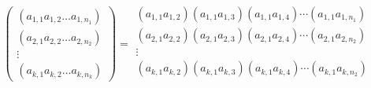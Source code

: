 $$ 
\left( 
	\begin{array}{c}
		(a_{1,1} a_{1,2} \dotsc a_{1,n_1})\\
		(a_{2,1}  a_{2,2} \dotsc a_{2,n_2})\\
		\vdots \\
		(a_{k,1} a_{k,2} \dotsc a_{k,n_k}) 
	\end{array}
	\right)
	= \begin{array}{c}
		(a_{1,1} a_{1,2}) (a_{1,1} a_{1,3}) (a_{1,1} a_{1,4}) \cdots (a_{1,1} a_{1,n_1})\\
		(a_{2,1} a_{2,2}) (a_{2,1} a_{2,3}) (a_{2,1} a_{2,4}) \cdots (a_{2,1} a_{2,n_2}) \\
		 \vdots \\
		 (a_{k,1} a_{k,2}) (a_{k,1} a_{k,3}) (a_{k,1} a_{k,4}) \cdots (a_{k,1} a_{k,n_2}) \\
	\end{array}
	$$
